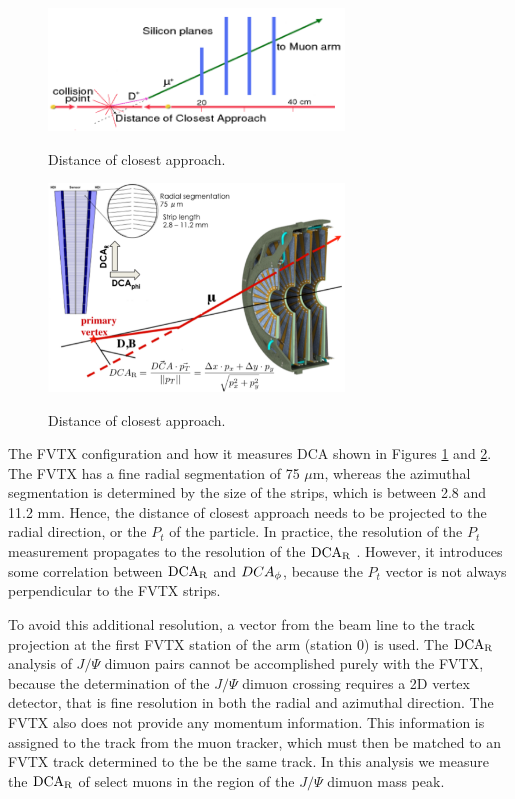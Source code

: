 \documentclass[12pt]{article}
\newcommand{\pt}{$P_{t}$ }
\newcommand{\jpsi}{$J/\Psi$ }
\newcommand{\dcar}{$\rm{DCA}_{R}$ }
\begin{document}
\begin{figure}[h]
\begin{center}
\includegraphics[width=0.7\textwidth,angle=0]{figures/DCA}
\\ \caption{Distance of closest approach.}
\label{fig:DCA}
\end{center}
\end{figure}

\begin{figure}[h]
\begin{center}
\includegraphics[width=0.7\textwidth,angle=0]{figures/FVTX_DCA_def}
\\ \caption{Distance of closest approach.}
\label{fig:DCA_2}
\end{center}
\end{figure}


The FVTX configuration and how it measures DCA shown in Figures \ref{fig:DCA} and \ref{fig:DCA_2}. The FVTX has a fine radial segmentation of 75 $\mu$m, 
whereas the azimuthal segmentation is determined by the size of the strips, which is between 2.8 and 11.2 mm. Hence, the distance of closest approach needs 
to be projected to the radial direction, or the \pt of the particle. In practice, the resolution of the \pt measurement propagates to the resolution of the \dcar. 
However, it introduces some correlation between \dcar and $DCA_{\rm \phi}$, because the \pt vector is not always perpendicular to the FVTX strips. 

To avoid this additional resolution, a vector from the beam line to the track projection at the first FVTX station of the arm (station 0) is used.
The \dcar analysis of \jpsi dimuon pairs cannot be accomplished purely with the FVTX, because the determination of the \jpsi dimuon crossing requires a 2D vertex detector, that is fine 
resolution in both the radial and azimuthal direction.  The FVTX also does not provide any momentum information.  This information is assigned to the track from the muon tracker, which 
must then be matched to an FVTX track determined to the be the same track. In this analysis we measure the \dcar of select muons in the region of the \jpsi dimuon mass peak. 
\end{document}
